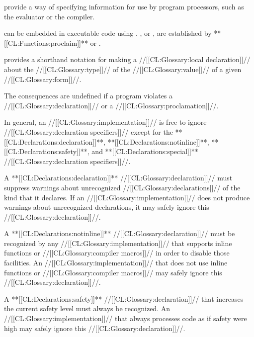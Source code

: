 

 provide a way of specifying information for use by
program processors, such as the evaluator or the compiler.

can be embedded in executable code using .
, 
or ,
are established by **[[CL:Functions:proclaim]]** or .


 provides a shorthand notation for 
making a //[[CL:Glossary:local declaration]]// about the //[[CL:Glossary:type]]// of the
//[[CL:Glossary:value]]// of a given //[[CL:Glossary:form]]//.






The consequences are undefined if a program violates a //[[CL:Glossary:declaration]]//
or a //[[CL:Glossary:proclamation]]//.


In general, an //[[CL:Glossary:implementation]]// is free to ignore
//[[CL:Glossary:declaration specifiers]]// except for the
     **[[CL:Declarations:declaration]]**,
     **[[CL:Declarations:notinline]]**,
     **[[CL:Declarations:safety]]**,
 and **[[CL:Declarations:special]]** //[[CL:Glossary:declaration specifiers]]//.

A **[[CL:Declarations:declaration]]** //[[CL:Glossary:declaration]]// must suppress warnings
about unrecognized //[[CL:Glossary:declarations]]// of the kind that it declares.
If an //[[CL:Glossary:implementation]]// does not produce warnings about
unrecognized declarations, it may safely ignore this //[[CL:Glossary:declaration]]//.

A **[[CL:Declarations:notinline]]** //[[CL:Glossary:declaration]]// must be recognized by any //[[CL:Glossary:implementation]]//
that supports inline functions or //[[CL:Glossary:compiler macros]]// in order to disable those facilities.
An //[[CL:Glossary:implementation]]// that does not use inline functions or //[[CL:Glossary:compiler macros]]//
may safely ignore this //[[CL:Glossary:declaration]]//.

A **[[CL:Declarations:safety]]** //[[CL:Glossary:declaration]]// that increases the current safety level 
must always be recognized.  An //[[CL:Glossary:implementation]]// that always processes 
code as if safety were high may safely ignore this //[[CL:Glossary:declaration]]//.

